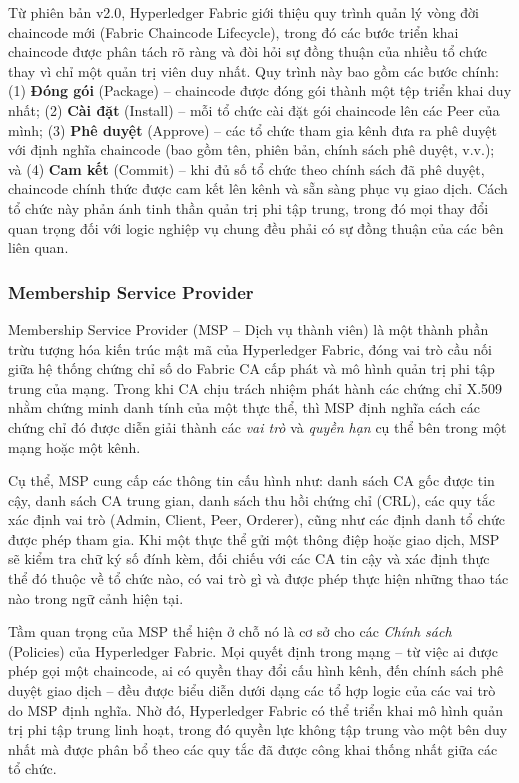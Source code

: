 Từ phiên bản v2.0, Hyperledger Fabric giới thiệu quy trình quản lý vòng đời chaincode mới (Fabric Chaincode Lifecycle), trong đó các bước triển khai chaincode được phân tách rõ ràng và đòi hỏi sự đồng thuận của nhiều tổ chức thay vì chỉ một quản trị viên duy nhất. Quy trình này bao gồm các bước chính: (1) \textbf{Đóng gói} (Package) -- chaincode được đóng gói thành một tệp triển khai duy nhất; (2) \textbf{Cài đặt} (Install) -- mỗi tổ chức cài đặt gói chaincode lên các Peer của mình; (3) \textbf{Phê duyệt} (Approve) -- các tổ chức tham gia kênh đưa ra phê duyệt với định nghĩa chaincode (bao gồm tên, phiên bản, chính sách phê duyệt, v.v.); và (4) \textbf{Cam kết} (Commit) -- khi đủ số tổ chức theo chính sách đã phê duyệt, chaincode chính thức được cam kết lên kênh và sẵn sàng phục vụ giao dịch. Cách tổ chức này phản ánh tinh thần quản trị phi tập trung, trong đó mọi thay đổi quan trọng đối với logic nghiệp vụ chung đều phải có sự đồng thuận của các bên liên quan.

\subsubsection{Membership Service Provider}

Membership Service Provider (MSP -- Dịch vụ thành viên) là một thành phần trừu tượng hóa kiến trúc mật mã của Hyperledger Fabric, đóng vai trò cầu nối giữa hệ thống chứng chỉ số do Fabric CA cấp phát và mô hình quản trị phi tập trung của mạng. Trong khi CA chịu trách nhiệm phát hành các chứng chỉ X.509 nhằm chứng minh danh tính của một thực thể, thì MSP định nghĩa cách các chứng chỉ đó được diễn giải thành các \textit{vai trò} và \textit{quyền hạn} cụ thể bên trong một mạng hoặc một kênh.

Cụ thể, MSP cung cấp các thông tin cấu hình như: danh sách CA gốc được tin cậy, danh sách CA trung gian, danh sách thu hồi chứng chỉ (CRL), các quy tắc xác định vai trò (Admin, Client, Peer, Orderer), cũng như các định danh tổ chức được phép tham gia. Khi một thực thể gửi một thông điệp hoặc giao dịch, MSP sẽ kiểm tra chữ ký số đính kèm, đối chiếu với các CA tin cậy và xác định thực thể đó thuộc về tổ chức nào, có vai trò gì và được phép thực hiện những thao tác nào trong ngữ cảnh hiện tại.

Tầm quan trọng của MSP thể hiện ở chỗ nó là cơ sở cho các \textit{Chính sách} (Policies) của Hyperledger Fabric. Mọi quyết định trong mạng -- từ việc ai được phép gọi một chaincode, ai có quyền thay đổi cấu hình kênh, đến chính sách phê duyệt giao dịch -- đều được biểu diễn dưới dạng các tổ hợp logic của các vai trò do MSP định nghĩa. Nhờ đó, Hyperledger Fabric có thể triển khai mô hình quản trị phi tập trung linh hoạt, trong đó quyền lực không tập trung vào một bên duy nhất mà được phân bổ theo các quy tắc đã được công khai thống nhất giữa các tổ chức.

